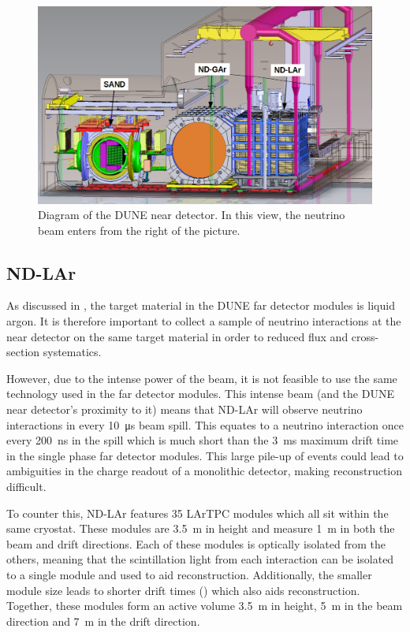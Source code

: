\begin{figure}[h]
  \centering
  \includegraphics[width=.9\linewidth]{files/figures/dune_detector/ndDiag.png}
  \caption[Diagram of the DUNE near detector.]{Diagram of the DUNE near detector. In this view, the neutrino beam enters from the right of the picture.}
  \label{fig:ndDiag}
\end{figure}

\subsection{ND-LAr}
\label{sec:dune:nd:lar}
As discussed in , the target material in the DUNE far detector modules is liquid argon.
It is therefore important to collect a sample of neutrino interactions at the near detector on the same target material in order to reduced flux and cross-section systematics.

However, due to the intense power of the beam, it is not feasible to use the same technology used in the far detector modules.
This intense beam (and the DUNE near detector's proximity to it) means that ND-LAr will observe  neutrino interactions in every \SI{10}{\micro\second} beam spill.
This equates to a neutrino interaction once every \SI{200}{\nano\second} in the spill which is much short than the \SI{3}{\milli\second} maximum drift time in the single phase far detector modules.
This large pile-up of events could lead to ambiguities in the charge readout of a monolithic detector, making reconstruction difficult.

To counter this, ND-LAr features 35 LArTPC modules which all sit within the same cryostat.
These modules are \SI{3.5}{\metre} in height and measure \SI{1}{\metre} in both the beam and drift directions.
Each of these modules is optically isolated from the others, meaning that the scintillation light from each interaction can be isolated to a single module and used to aid reconstruction.
Additionally, the smaller module size leads to shorter drift times () which also aids reconstruction.
Together, these modules form an active volume \SI{3.5}{\metre} in height, \SI{5}{\metre} in the beam direction and \SI{7}{\metre} in the drift direction.

